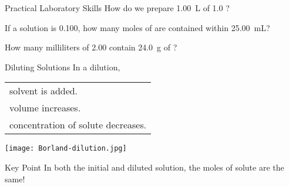 \documentclass[notes=only]{beamer}
\begin{document}
\begin{frame}[t]{Practical Laboratory Skills}
	How do we prepare \SI{1.00}{\liter} of \SI{1.0}{\Molar} ?

\end{frame}

\begin{onyourown}
	If a solution is \SI{0.100}{\Molar}, how many moles of  are
	contained within \SI{25.00}{\milli\liter}?
\end{onyourown}

\begin{onyourown}
	How many milliliters of \SI{2.00}{\Molar}  contain
	\SI{24.0}{\gram} of ?
\end{onyourown}

\clearpage

\begin{frame}{Diluting Solutions}
	In a \alert{dilution},
	\begin{tabular}[t] {@{~}l}
		solvent is added. \\
		volume increases. \\
		concentration of solute \alert{decreases}. \\
	\end{tabular}
	
	\bigskip
	
	\begin{center}
		\texttt{[image: Borland-dilution.jpg]}
	\end{center}

	\begin{alertblock}{Key Point}
		In both the initial and diluted solution, the moles of solute
		are the \alert{same}!
	\end{alertblock}

\end{frame}
\end{document}
